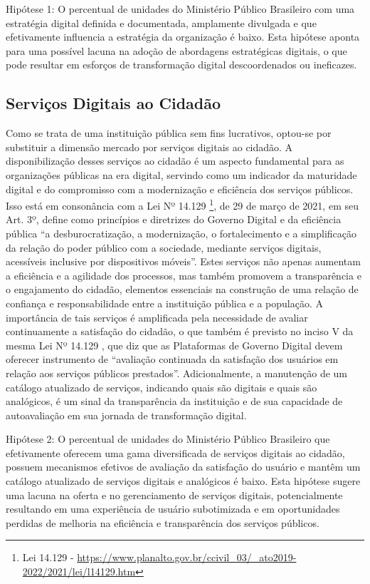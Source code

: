 Hipótese 1: O percentual de unidades do Ministério Público Brasileiro com uma estratégia digital definida e documentada, amplamente divulgada e que efetivamente influencia a estratégia da organização é baixo. Esta hipótese aponta para uma possível lacuna na adoção de abordagens estratégicas digitais, o que pode resultar em esforços de transformação digital descoordenados ou ineficazes.

\subsection{Serviços Digitais ao Cidadão}

Como se trata de uma instituição pública sem fins lucrativos, optou-se por substituir a dimensão mercado por serviços digitais ao cidadão. A disponibilização desses serviços ao cidadão é um aspecto fundamental para as organizações públicas na era digital, servindo como um indicador da maturidade digital e do compromisso com a modernização e eficiência dos serviços públicos. Isso está em consonância com a Lei Nº 14.129 \footnote{Lei 14.129 \label{lei14129} - \url{https://www.planalto.gov.br/ccivil_03/_ato2019-2022/2021/lei/l14129.htm}}, de 29 de março de 2021, em seu Art. 3º, define como princípios e diretrizes do Governo Digital e da eficiência pública “a desburocratização, a modernização, o fortalecimento e a simplificação da relação do poder público com a sociedade, mediante serviços digitais, acessíveis inclusive por dispositivos móveis”. Estes serviços não apenas aumentam a eficiência e a agilidade dos processos, mas também promovem a transparência e o engajamento do cidadão, elementos essenciais na construção de uma relação de confiança e responsabilidade entre a instituição pública e a população. A importância de tais serviços é amplificada pela necessidade de avaliar continuamente a satisfação do cidadão, o que também é previsto no inciso V da mesma Lei Nº 14.129 , que diz que as Plataformas de Governo Digital devem oferecer instrumento de “avaliação continuada da satisfação dos usuários em relação aos serviços públicos prestados”. Adicionalmente, a manutenção de um catálogo atualizado de serviços, indicando quais são digitais e quais são analógicos, é um sinal da transparência da instituição e de sua capacidade de autoavaliação em sua jornada de transformação digital.

Hipótese 2: O percentual de unidades do Ministério Público Brasileiro que efetivamente oferecem uma gama diversificada de serviços digitais ao cidadão, possuem mecanismos efetivos de avaliação da satisfação do usuário e mantêm um catálogo atualizado de serviços digitais e analógicos é baixo. Esta hipótese sugere uma lacuna na oferta e no gerenciamento de serviços digitais, potencialmente resultando em uma experiência de usuário subotimizada e em oportunidades perdidas de melhoria na eficiência e transparência dos serviços públicos.


